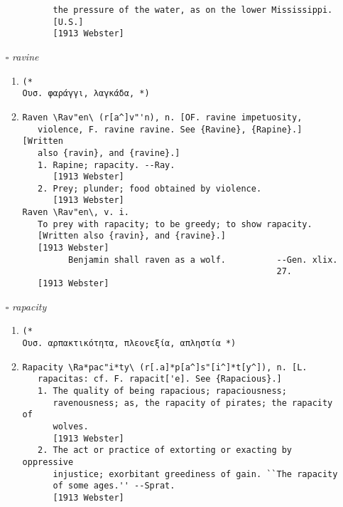 \documentclass{article}
\begin{document}
\begin{itemize}
\begin{enumerate}
{\begin{lstlisting}
      the pressure of the water, as on the lower Mississippi.
      [U.S.]
      [1913 Webster]
\end{lstlisting}}
\end{enumerate}
\item[$\square$] \emph{ ravine }
\begin{enumerate}
\item{
\begin{lstlisting}
(* 
Ουσ. φαράγγι, λαγκάδα, *)
\end{lstlisting}}
\item{
\begin{lstlisting}
Raven \Rav"en\ (r[a^]v"'n), n. [OF. ravine impetuosity,
   violence, F. ravine ravine. See {Ravine}, {Rapine}.] [Written
   also {ravin}, and {ravine}.]
   1. Rapine; rapacity. --Ray.
      [1913 Webster]
   2. Prey; plunder; food obtained by violence.
      [1913 Webster]
Raven \Rav"en\, v. i.
   To prey with rapacity; to be greedy; to show rapacity.
   [Written also {ravin}, and {ravine}.]
   [1913 Webster]
         Benjamin shall raven as a wolf.          --Gen. xlix.
                                                  27.
   [1913 Webster]
\end{lstlisting}}
\end{enumerate}
\item[$\square$] \emph{ rapacity }
\begin{enumerate}
\item{
\begin{lstlisting}
(* 
Ουσ. αρπακτικότητα, πλεονεξία, απληστία *)
\end{lstlisting}}
\item{
\begin{lstlisting}
Rapacity \Ra*pac"i*ty\ (r[.a]*p[a^]s"[i^]*t[y^]), n. [L.
   rapacitas: cf. F. rapacit['e]. See {Rapacious}.]
   1. The quality of being rapacious; rapaciousness;
      ravenousness; as, the rapacity of pirates; the rapacity of
      wolves.
      [1913 Webster]
   2. The act or practice of extorting or exacting by oppressive
      injustice; exorbitant greediness of gain. ``The rapacity
      of some ages.'' --Sprat.
      [1913 Webster]
\end{lstlisting}}
\end{enumerate}


\end{itemize}
\end{document}
